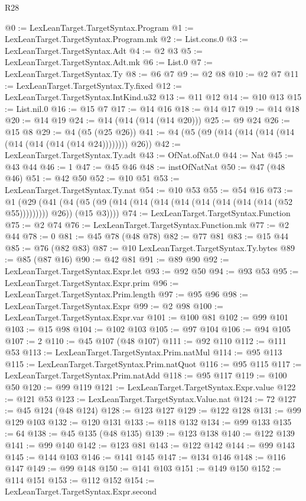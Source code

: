 \begin{lexlean}{R28}
\begin{coremodule}
@0 := LexLeanTarget.TargetSyntax.Program
@1 := LexLeanTarget.TargetSyntax.Program.mk
@2 := List.cons.{0}
@3 := LexLeanTarget.TargetSyntax.Adt
@4 := @2 @3
@5 := LexLeanTarget.TargetSyntax.Adt.mk
@6 := List.{0}
@7 := LexLeanTarget.TargetSyntax.Ty
@8 := @6 @7
@9 := @2 @8
@10 := @2 @7
@11 := LexLeanTarget.TargetSyntax.Ty.fixed
@12 := LexLeanTarget.TargetSyntax.IntKind.u32
@13 := @11 @12
@14 := @10 @13
@15 := List.nil.{0}
@16 := @15 @7
@17 := @14 @16
@18 := @14 @17
@19 := @14 @18
@20 := @14 @19
@24 := @14 (@14 (@14 (@14 @20)))
@25 := @9 @24
@26 := @15 @8
@29 := @4 (@5 (@25 @26))
@41 := @4 (@5 (@9 (@14 (@14 (@14 (@14 (@14 (@14 (@14 (@14 @24)))))))) @26))
@42 := LexLeanTarget.TargetSyntax.Ty.adt
@43 := OfNat.ofNat.{0}
@44 := Nat
@45 := @43 @44
@46 := 1
@47 := @45 @46
@48 := instOfNatNat
@50 := @47 (@48 @46)
@51 := @42 @50
@52 := @10 @51
@53 := LexLeanTarget.TargetSyntax.Ty.nat
@54 := @10 @53
@55 := @54 @16
@73 := @1
    (@29
      (@41 (@4 (@5 (@9 (@14 (@14 (@14 (@14 (@14 (@14 (@14 (@14 (@52 @55))))))))) @26)) (@15 @3))))
@74 := LexLeanTarget.TargetSyntax.Function
@75 := @2 @74
@76 := LexLeanTarget.TargetSyntax.Function.mk
@77 := @2 @44
@78 := 0
@81 := @45 @78 (@48 @78)
@82 := @77 @81
@83 := @15 @44
@85 := @76 (@82 @83)
@87 := @10 LexLeanTarget.TargetSyntax.Ty.bytes
@89 := @85 (@87 @16)
@90 := @42 @81
@91 := @89 @90
@92 := LexLeanTarget.TargetSyntax.Expr.let
@93 := @92 @50
@94 := @93 @53
@95 := LexLeanTarget.TargetSyntax.Expr.prim
@96 := LexLeanTarget.TargetSyntax.Prim.length
@97 := @95 @96
@98 := LexLeanTarget.TargetSyntax.Expr
@99 := @2 @98
@100 := LexLeanTarget.TargetSyntax.Expr.var
@101 := @100 @81
@102 := @99 @101
@103 := @15 @98
@104 := @102 @103
@105 := @97 @104
@106 := @94 @105
@107 := 2
@110 := @45 @107 (@48 @107)
@111 := @92 @110
@112 := @111 @53
@113 := LexLeanTarget.TargetSyntax.Prim.natMul
@114 := @95 @113
@115 := LexLeanTarget.TargetSyntax.Prim.natQuot
@116 := @95 @115
@117 := LexLeanTarget.TargetSyntax.Prim.natAdd
@118 := @95 @117
@119 := @100 @50
@120 := @99 @119
@121 := LexLeanTarget.TargetSyntax.Expr.value
@122 := @121 @53
@123 := LexLeanTarget.TargetSyntax.Value.nat
@124 := 72
@127 := @45 @124 (@48 @124)
@128 := @123 @127
@129 := @122 @128
@131 := @99 @129 @103
@132 := @120 @131
@133 := @118 @132
@134 := @99 @133
@135 := 64
@138 := @45 @135 (@48 @135)
@139 := @123 @138
@140 := @122 @139
@141 := @99 @140
@142 := @123 @81
@143 := @122 @142
@144 := @99 @143
@145 := @144 @103
@146 := @141 @145
@147 := @134 @146
@148 := @116 @147
@149 := @99 @148
@150 := @141 @103
@151 := @149 @150
@152 := @114 @151
@153 := @112 @152
@154 := LexLeanTarget.TargetSyntax.Expr.second

\end{coremodule}
\end{lexlean}
